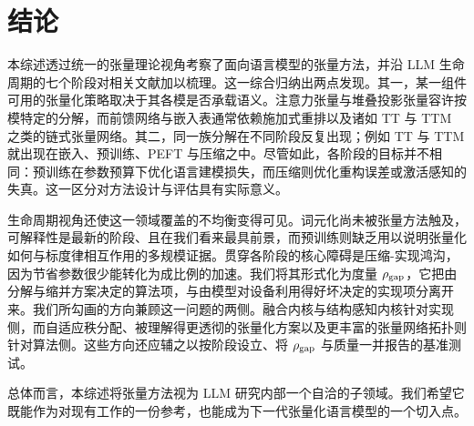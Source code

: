 \documentclass[11pt]{article}
\begin{document}
\section{结论}
\label{sec:conclusion}
本综述透过统一的张量理论视角考察了面向语言模型的张量方法，并沿 LLM 生命周期的七个阶段对相关文献加以梳理。这一综合归纳出两点发现。其一，某一组件可用的张量化策略取决于其各模是否承载语义。注意力张量与堆叠投影张量容许按模特定的分解，而前馈网络与嵌入表通常依赖施加式重排以及诸如 TT 与 TTM 之类的链式张量网络。其二，同一族分解在不同阶段反复出现；例如 TT 与 TTM 就出现在嵌入、预训练、PEFT 与压缩之中。尽管如此，各阶段的目标并不相同：预训练在参数预算下优化语言建模损失，而压缩则优化重构误差或激活感知的失真。这一区分对方法设计与评估具有实际意义。

生命周期视角还使这一领域覆盖的不均衡变得可见。词元化尚未被张量方法触及，可解释性是最新的阶段、且在我们看来最具前景，而预训练则缺乏用以说明张量化如何与标度律相互作用的多规模证据。贯穿各阶段的核心障碍是压缩-实现鸿沟，因为节省参数很少能转化为成比例的加速。我们将其形式化为度量 $\rho_{\rm gap}$，它把由分解与缩并方案决定的算法项，与由模型对设备利用得好坏决定的实现项分离开来。我们所勾画的方向兼顾这一问题的两侧。融合内核与结构感知内核针对实现侧，而自适应秩分配、被理解得更透彻的张量化方案以及更丰富的张量网络拓扑则针对算法侧。这些方向还应辅之以按阶段设立、将 $\rho_{\rm gap}$ 与质量一并报告的基准测试。

总体而言，本综述将张量方法视为 LLM 研究内部一个自洽的子领域。我们希望它既能作为对现有工作的一份参考，也能成为下一代张量化语言模型的一个切入点。

\end{document}
